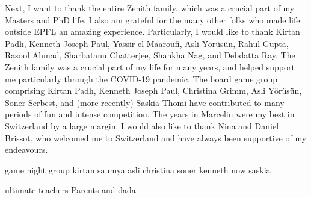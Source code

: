 Next, I want to thank the entire Zenith family, which was a crucial part of my
Masters and PhD life. 
I also am grateful for the many other folks who made life outside EPFL an amazing
experience.
Particularly, I would like to thank Kirtan Padh, Kenneth Joseph Paul, 
Yassir el Maaroufi, Asli Yörüsün, Rahul Gupta, Rasool Ahmad, Sharbatanu Chatterjee, 
Shankha Nag, and Debdatta Ray.
The Zenith family was a crucial part of my life for many years, and helped support
me particularly through the COVID-19 pandemic.
The board game group comprising Kirtan Padh, Kenneth Joseph Paul, Christina Grimm,
Asli Yörüsün, Soner Serbest, and (more recently) Saskia Thomi have contributed to 
many periods of fun and intense competition. 
The years in Marcelin were my best in Switzerland by a large margin.
I would also like to thank Nina and Daniel Brissot, who welcomed me to Switzerland
and have always been supportive of my endeavours.


game night group
kirtan
saumya
asli
christina
soner
kenneth
now saskia

ultimate teachers
Parents and dada